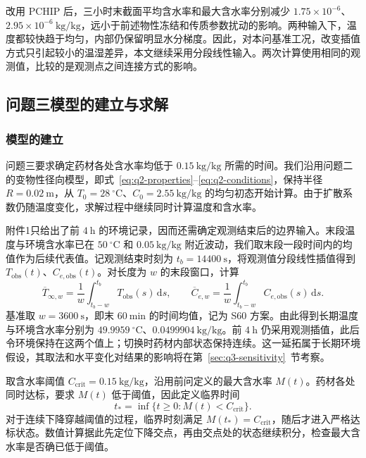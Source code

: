 \documentclass[UTF8,a4paper]{ctexart}
\begin{document}
改用 PCHIP 后，三小时末截面平均含水率和最大含水率分别减少 \(1.75\times10^{-6}\)、\(2.95\times10^{-6}~\mathrm{kg/kg}\)，远小于前述物性冻结和传质参数扰动的影响。两种输入下，温度都较快趋于均匀，内部仍保留明显水分梯度。因此，对本问基准工况，改变插值方式只引起较小的温湿差异，本文继续采用分段线性输入。两次计算使用相同的观测值，比较的是观测点之间连接方式的影响。

\subsection{问题三模型的建立与求解}
\label{sec:q3}

\subsubsection{模型的建立}
\label{sec:q3-model}

问题三要求确定药材各处含水率均低于 \(0.15~\mathrm{kg/kg}\) 所需的时间。我们沿用问题二的变物性径向模型，即式~\eqref{eq:q2-properties}--\eqref{eq:q2-conditions}，保持半径 \(R=0.02~\mathrm m\)，从 \(T_0=28~^\circ\mathrm C\)、\(C_0=2.55~\mathrm{kg/kg}\) 的均匀初态开始计算。由于扩散系数仍随温度变化，求解过程中继续同时计算温度和含水率。

附件1只给出了前 \(4~\mathrm h\) 的环境记录，因而还需确定观测结束后的边界输入。末段温度与环境含水率已在 \(50~^\circ\mathrm C\) 和 \(0.05~\mathrm{kg/kg}\) 附近波动，我们取末段一段时间内的均值作为后续代表值。记观测结束时刻为 \(t_b=14400~\mathrm s\)，将观测值分段线性插值得到 \(T_{\mathrm{obs}}(t)\)、\(C_{e,\mathrm{obs}}(t)\)。对长度为 \(w\) 的末段窗口，计算
\begin{equation}
\overline T_{\infty,w}=\frac{1}{w}\int_{t_b-w}^{t_b}T_{\mathrm{obs}}(s)\,\mathrm ds,
\qquad
\overline C_{e,w}=\frac{1}{w}\int_{t_b-w}^{t_b}C_{e,\mathrm{obs}}(s)\,\mathrm ds.
\label{eq:q3-platform}
\end{equation}
基准取 \(w=3600~\mathrm s\)，即末 \(60~\mathrm{min}\) 的时间均值，记为 S60 方案。由此得到长期温度与环境含水率分别为 \(49.9959~^\circ\mathrm C\)、\(0.0499904~\mathrm{kg/kg}\)。前 \(4~\mathrm h\) 仍采用观测插值，此后令环境保持在这两个值上；切换时药材内部状态保持连续。这一延拓属于长期环境假设，其取法和水平变化对结果的影响将在第~\ref{sec:q3-sensitivity}~节考察。

取含水率阈值 \(C_{\mathrm{crit}}=0.15~\mathrm{kg/kg}\)，沿用前问定义的最大含水率 \(M(t)\)。药材各处同时达标，要求 \(M(t)\) 低于阈值，因此定义临界时间
\begin{equation}
t_*=\inf\{t\ge0:M(t)<C_{\mathrm{crit}}\}.
\label{eq:q3-event}
\end{equation}
对于连续下降穿越阈值的过程，临界时刻满足 \(M(t_*)=C_{\mathrm{crit}}\)，随后才进入严格达标状态。数值计算据此先定位下降交点，再由交点处的状态继续积分，检查最大含水率是否确已低于阈值。
\end{document}
